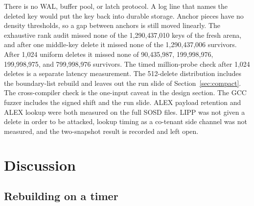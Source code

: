 \documentclass[conference]{IEEEtran}
\begin{document}
There is no WAL, buffer pool, or latch protocol. A log line that names the deleted key would put the key back into durable storage.
Anchor pieces have no density thresholds, so a gap between anchors is still moved linearly.
The exhaustive rank audit missed none of the 1{,}290{,}437{,}010 keys of the fresh arena, and after one middle-key delete it missed none of the 1{,}290{,}437{,}006 survivors.
After 1{,}024 uniform deletes it missed none of 90{,}435{,}987, 199{,}998{,}976, 199{,}998{,}975, and 799{,}998{,}976 survivors.
The timed million-probe check after 1{,}024 deletes is a separate latency measurement.
The 512-delete distribution includes the boundary-list rebuild and leaves out the run slide of Section~\ref{sec:compact}.
The cross-compiler check is the one-input caveat in the design section.
The GCC fuzzer includes the signed shift and the run slide.
ALEX payload retention and ALEX lookup were both measured on the full SOSD files.
LIPP was not given a delete in order to be attacked, lookup timing as a co-tenant side channel was not measured, and the two-snapshot result is recorded and left open.

\section{Discussion}

\subsection{Rebuilding on a timer}
\end{document}

